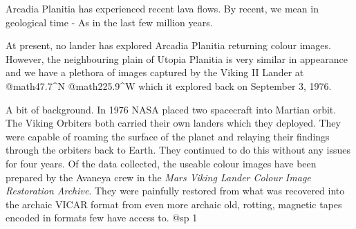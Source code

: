 Arcadia Planitia has experienced recent lava flows. By recent, we mean in geological time - As in the last few million years.


At present, no lander has explored Arcadia Planitia returning colour images. However, the neighbouring plain of Utopia Planitia is very similar in appearance and we have a plethora of images captured by the Viking II Lander at @math{47.7^{\circ}}N @math{225.9^{\circ}}W which it explored back on September 3, 1976.

A bit of background. In 1976 NASA placed two spacecraft into Martian orbit. The Viking Orbiters both carried their own landers which they deployed. They were capable of roaming the surface of the planet and relaying their findings through the orbiters back to Earth. They continued to do this without any issues for four years. Of the data collected, the useable colour images have been prepared by the Avaneya crew in the {\it Mars Viking Lander Colour Image Restoration Archive}. They were painfully restored from what was recovered into the archaic VICAR format from even more archaic old, rotting, magnetic tapes encoded in formats few have access to.
@sp 1


